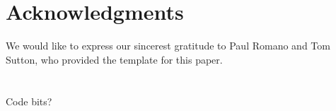 \documentclass{mc2015}
\begin{document}
\lipsum[11-15]

\section{Acknowledgments}

We would like to express our sincerest gratitude to Paul Romano and Tom Sutton, who provided the template for this paper.

\setlength{\baselineskip}{12pt}




\appendix
\section{}

Code bits?
\end{document}
